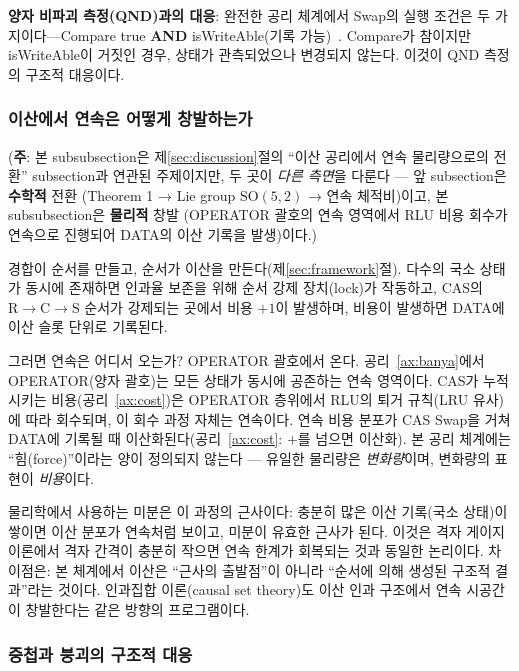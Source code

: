 \documentclass[entropy,article,submit,pdftex,oneauthor]{Definitions/mdpi}
\begin{document}
\textbf{양자 비파괴 측정(QND)과의 대응}: 완전한 공리 체계에서 Swap의 실행 조건은 두 가지이다---Compare true \textbf{AND} isWriteAble(기록 가능)~\cite{han2026}. Compare가 참이지만 isWriteAble이 거짓인 경우, 상태가 관측되었으나 변경되지 않는다. 이것이 QND 측정의 구조적 대응이다.

\subsubsection{이산에서 연속은 어떻게 창발하는가}

(\textbf{주}: 본 subsubsection은 제\ref{sec:discussion}절의 ``이산 공리에서 연속 물리량으로의 전환'' subsection과 연관된 주제이지만, 두 곳이 \emph{다른 측면}을 다룬다 — 앞 subsection은 \textbf{수학적} 전환 (Theorem 1 → Lie group $\mathrm{SO}(5,2)$ → 연속 체적비)이고, 본 subsubsection은 \textbf{물리적} 창발 (OPERATOR 괄호의 연속 영역에서 RLU 비용 회수가 연속으로 진행되어 DATA의 이산 기록을 발생)이다.)

경합이 순서를 만들고, 순서가 이산을 만든다(제\ref{sec:framework}절). 다수의 국소 상태가 동시에 존재하면 인과율 보존을 위해 순서 강제 장치(lock)가 작동하고, CAS의 $\mathrm{R} \to \mathrm{C} \to \mathrm{S}$ 순서가 강제되는 곳에서 비용 $+1$이 발생하며, 비용이 발생하면 DATA에 이산 슬롯 단위로 기록된다.

그러면 연속은 어디서 오는가? OPERATOR 괄호에서 온다. 공리~\ref{ax:banya}에서 OPERATOR(양자 괄호)는 모든 상태가 동시에 공존하는 연속 영역이다. CAS가 누적시키는 비용(공리~\ref{ax:cost})은 OPERATOR 층위에서 RLU의 퇴거 규칙(LRU 유사)에 따라 회수되며, 이 회수 과정 자체는 연속이다. 연속 비용 분포가 CAS Swap을 거쳐 DATA에 기록될 때 이산화된다(공리~\ref{ax:cost}: $+$를 넘으면 이산화). 본 공리 체계에는 ``힘(force)''이라는 양이 정의되지 않는다 — 유일한 물리량은 \emph{변화량}이며, 변화량의 표현이 \emph{비용}이다.

물리학에서 사용하는 미분은 이 과정의 근사이다: 충분히 많은 이산 기록(국소 상태)이 쌓이면 이산 분포가 연속처럼 보이고, 미분이 유효한 근사가 된다. 이것은 격자 게이지이론에서 격자 간격이 충분히 작으면 연속 한계가 회복되는 것과 동일한 논리이다. 차이점은: 본 체계에서 이산은 ``근사의 출발점''이 아니라 ``순서에 의해 생성된 구조적 결과''라는 것이다. 인과집합 이론(causal set theory)도 이산 인과 구조에서 연속 시공간이 창발한다는 같은 방향의 프로그램이다.

\subsubsection{중첩과 붕괴의 구조적 대응}
\end{document}
